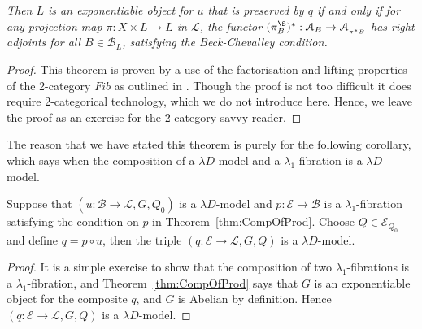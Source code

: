 \documentclass[a4paper,UKenglish]{lipics}
\newcommand{\LamOneFib}{$\lambda_1$-fibration\xspace}
\newcommand{\LamOneFibs}{$\lambda_1$-fibrations\xspace}
\newcommand{\A}{\mathcal{A}}
\newcommand{\B}{\mathcal{B}}
\newcommand{\E}{\mathcal{E}}
\newcommand{\fibre}[2]{#1_{_{#2}}}
\begin{document}
\noindent \emph{Then $L$ is an exponentiable object for $u$ that is preserved by $q$ if and only if for any projection map $\pi : X \times L \rightarrow L$ in $\mathcal{L}$, the functor $(\pi^\S_B)^\ast : \A_B \rightarrow \fibre{\A}{\pi^\ast B}$ has right adjoints for all $B \in \B_L$, satisfying the Beck-Chevalley condition.}






\begin{proof}
This theorem is proven by a use of the factorisation and lifting properties of the 2-category $Fib$ as outlined in \cite{hermida1999some}. Though the proof is not too difficult it does require 2-categorical technology, which we do not introduce here. Hence, we leave the proof as an exercise for the 2-category-savvy reader.
\end{proof}

The reason that we have stated this theorem is purely for the following corollary, which says when the composition of a $\lambda D$-model and a \LamOneFib is a $\lambda D$-model.

\begin{corollary}
\label{cor:UoMAndLamOne}
Suppose that $(u:\B \rightarrow \mathcal{L}, G, Q_0)$ is a $\lambda D$-model and $p: \E \rightarrow \B$ is a \LamOneFib satisfying the condition on $p$ in Theorem~\ref{thm:CompOfProd}. Choose $Q \in \E_{Q_0}$ and define $q = p \circ u$, then the triple $(q : \E \rightarrow \mathcal{L}, G, Q)$ is a $\lambda D$-model.
\end{corollary}

\begin{proof}
It is a simple exercise to show that the composition of two \LamOneFibs is a \LamOneFib, and Theorem~\ref{thm:CompOfProd} says that $G$ is an exponentiable object for the composite $q$, and $G$ is Abelian by definition. Hence $(q : \E \rightarrow \mathcal{L}, G, Q)$ is a $\lambda D$-model.
\end{proof}
\end{document}
